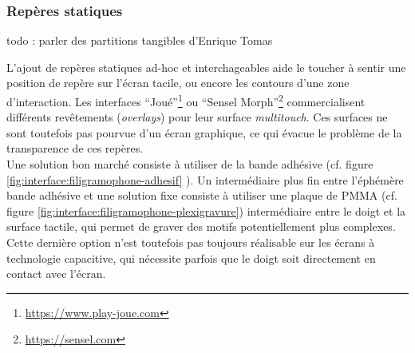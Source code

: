 \subsubsection{Repères statiques}
todo : parler des partitions tangibles d'Enrique Tomas

\noindent L'ajout de repères statiques ad-hoc et interchageables aide le toucher à sentir une position de repère sur l'écran tacile, ou encore les contours d'une zone d'interaction. Les interfaces ``Joué''\footnote{\url{https://www.play-joue.com}} ou ``Sensel Morph''\footnote{\url{https://sensel.com}} commercialisent différents revêtements (\textit{overlays}) pour leur surface \textit{multitouch}. Ces surfaces ne sont toutefois pas pourvue d'un écran graphique, ce qui évacue le problème de la transparence de ces repères.\\
Une solution bon marché consiste à utiliser de la bande adhésive (cf. figure \ref{fig:interface:filigramophone-adhesif}
). Un intermédiaire plus fin entre l'éphémère bande adhésive et une solution fixe consiste à utiliser une plaque de \gls{PMMA} (cf. figure \ref{fig:interface:filigramophone-plexigravure}) intermédiaire entre le doigt et la surface tactile, qui permet de graver des motifs potentiellement plus complexes. Cette dernière option n'est toutefois pas toujours réalisable sur les écrans à technologie capacitive, qui nécessite parfois que le doigt soit directement en contact avec l'écran.

